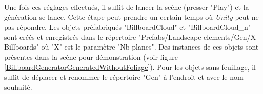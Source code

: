 		\begin{minipage}{\linewidth}
			\label{BillboardGeneratorSettings}
		\end{minipage}\medskip
		
		Une fois ces réglages effectués, il suffit de lancer la scène (presser "Play") et la génération se lance. Cette étape peut prendre un certain temps où \textit{Unity} peut ne pas répondre. Les objets préfabriqués "BillboardCloud" et "BillboardCloud\_n" sont créés et enregistrés dans le répertoire "Prefabs/Landscape elements/Gen/X Billboards" où "X" est le paramètre "Nb planes". Des instances de ces objets sont présentes dans la scène pour démonstration (voir figure  \ref{BillboardGeneratorGeneratedWithoutFoliage}). Pour les objets sans feuillage, il suffit de déplacer et renommer le répertoire "Gen" à l'endroit et avec le nom souhaité.\medskip		
		
		\begin{minipage}{\linewidth}
			\label{BillboardGeneratorGeneratedWithoutFoliage}
		\end{minipage}\medskip
		
